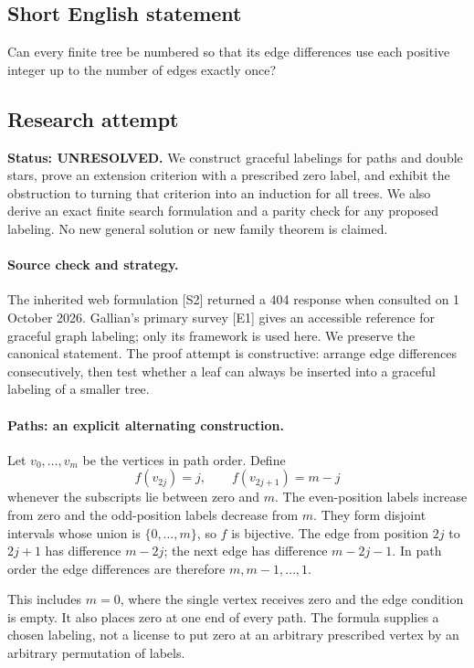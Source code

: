 \documentclass[11pt,a4paper]{article}
\begin{document}
\subsection{Short English statement}

Can every finite tree be numbered so that its edge differences use each positive integer up to the number of edges exactly once?

\subsection{Research attempt}
\textbf{Status: UNRESOLVED.} We construct graceful labelings for paths and double stars, prove an extension criterion with a prescribed zero label, and exhibit the obstruction to turning that criterion into an induction for all trees. We also derive an exact finite search formulation and a parity check for any proposed labeling. No new general solution or new family theorem is claimed.

\paragraph{Source check and strategy.}
The inherited web formulation [S2] returned a 404 response when consulted on 1 October 2026. Gallian's primary survey [E1] gives an accessible reference for graceful graph labeling; only its framework is used here. We preserve the canonical statement. The proof attempt is constructive: arrange edge differences consecutively, then test whether a leaf can always be inserted into a graceful labeling of a smaller tree.

\paragraph{Paths: an explicit alternating construction.}
Let $v_0,\ldots,v_m$ be the vertices in path order. Define
\[
f(v_{2j})=j,\qquad f(v_{2j+1})=m-j
\]
whenever the subscripts lie between zero and $m$. The even-position labels increase from zero and the odd-position labels decrease from $m$. They form disjoint intervals whose union is $\{0,\ldots,m\}$, so $f$ is bijective. The edge from position $2j$ to $2j+1$ has difference $m-2j$; the next edge has difference $m-2j-1$. In path order the edge differences are therefore $m,m-1,\ldots,1$.

This includes $m=0$, where the single vertex receives zero and the edge condition is empty. It also places zero at one end of every path. The formula supplies a chosen labeling, not a license to put zero at an arbitrary prescribed vertex by an arbitrary permutation of labels.
\end{document}
